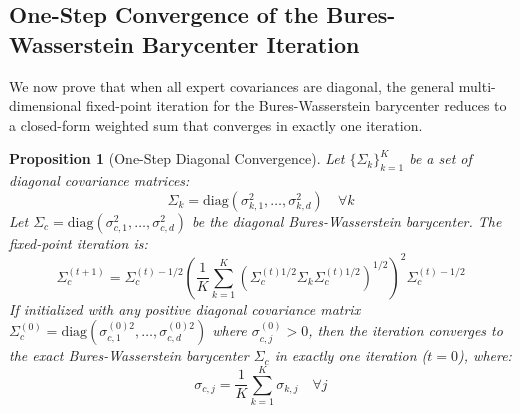 \documentclass{article}
\theoremstyle{plain}
\newtheorem{proposition}[theorem]{Proposition}
\theoremstyle{definition}
\theoremstyle{remark}
\begin{document}
\subsection{One-Step Convergence of the Bures-Wasserstein Barycenter Iteration}
We now prove that when all expert covariances are diagonal, the general multi-dimensional fixed-point iteration for the Bures-Wasserstein barycenter reduces to a closed-form weighted sum that converges in exactly one iteration.

\begin{proposition}[One-Step Diagonal Convergence]
Let $\{\Sigma_k\}_{k=1}^K$ be a set of diagonal covariance matrices:
\begin{equation}
  \Sigma_k = \mathrm{diag}(\sigma_{k, 1}^2, \dots, \sigma_{k, d}^2) \quad \forall k
\end{equation}
Let $\Sigma_c = \mathrm{diag}(\sigma_{c, 1}^2, \dots, \sigma_{c, d}^2)$ be the diagonal Bures-Wasserstein barycenter. The fixed-point iteration is:
\begin{equation}
  \Sigma_c^{(t+1)} = \Sigma_c^{(t)-1/2} \left( \frac{1}{K} \sum_{k=1}^K \left( \Sigma_c^{(t)1/2} \Sigma_k \Sigma_c^{(t)1/2} \right)^{1/2} \right)^2 \Sigma_c^{(t)-1/2}
\end{equation}
If initialized with any positive diagonal covariance matrix $\Sigma_c^{(0)} = \mathrm{diag}(\sigma_{c, 1}^{(0)2}, \dots, \sigma_{c, d}^{(0)2})$ where $\sigma_{c, j}^{(0)} > 0$, then the iteration converges to the exact Bures-Wasserstein barycenter $\Sigma_c$ in exactly one iteration ($t = 0$), where:
\begin{equation}
  \sigma_{c, j} = \frac{1}{K} \sum_{k=1}^K \sigma_{k, j} \quad \forall j
\end{equation}
\end{proposition}
\end{document}
